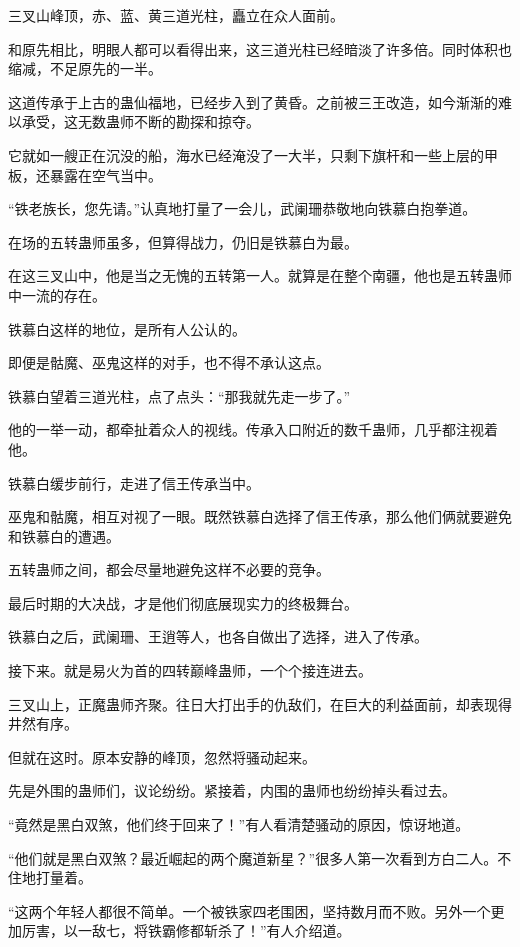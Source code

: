 
\begin{this_body}

三叉山峰顶，赤、蓝、黄三道光柱，矗立在众人面前。

和原先相比，明眼人都可以看得出来，这三道光柱已经暗淡了许多倍。同时体积也缩减，不足原先的一半。

这道传承于上古的蛊仙福地，已经步入到了黄昏。之前被三王改造，如今渐渐的难以承受，这无数蛊师不断的勘探和掠夺。

它就如一艘正在沉没的船，海水已经淹没了一大半，只剩下旗杆和一些上层的甲板，还暴露在空气当中。

“铁老族长，您先请。”认真地打量了一会儿，武阑珊恭敬地向铁慕白抱拳道。

在场的五转蛊师虽多，但算得战力，仍旧是铁慕白为最。

在这三叉山中，他是当之无愧的五转第一人。就算是在整个南疆，他也是五转蛊师中一流的存在。

铁慕白这样的地位，是所有人公认的。

即便是骷魔、巫鬼这样的对手，也不得不承认这点。

铁慕白望着三道光柱，点了点头：“那我就先走一步了。”

他的一举一动，都牵扯着众人的视线。传承入口附近的数千蛊师，几乎都注视着他。

铁慕白缓步前行，走进了信王传承当中。

巫鬼和骷魔，相互对视了一眼。既然铁慕白选择了信王传承，那么他们俩就要避免和铁慕白的遭遇。

五转蛊师之间，都会尽量地避免这样不必要的竞争。

最后时期的大决战，才是他们彻底展现实力的终极舞台。

铁慕白之后，武阑珊、王逍等人，也各自做出了选择，进入了传承。

接下来。就是易火为首的四转巅峰蛊师，一个个接连进去。

三叉山上，正魔蛊师齐聚。往日大打出手的仇敌们，在巨大的利益面前，却表现得井然有序。

但就在这时。原本安静的峰顶，忽然将骚动起来。

先是外围的蛊师们，议论纷纷。紧接着，内围的蛊师也纷纷掉头看过去。

“竟然是黑白双煞，他们终于回来了！”有人看清楚骚动的原因，惊讶地道。

“他们就是黑白双煞？最近崛起的两个魔道新星？”很多人第一次看到方白二人。不住地打量着。

“这两个年轻人都很不简单。一个被铁家四老围困，坚持数月而不败。另外一个更加厉害，以一敌七，将铁霸修都斩杀了！”有人介绍道。


\end{this_body}
